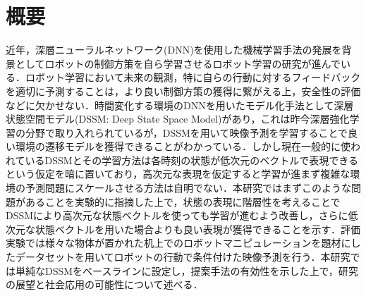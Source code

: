\chapter*{概要}
\label{chap:abstract}

近年，深層ニューラルネットワーク(DNN)を使用した機械学習手法の発展を背景としてロボットの制御方策を自ら学習させるロボット学習の研究が進んでいる．ロボット学習において未来の観測，特に自らの行動に対するフィードバックを適切に予測することは，より良い制御方策の獲得に繋がえる上，安全性の評価などに欠かせない．時間変化する環境のDNNを用いたモデル化手法として深層状態空間モデル(DSSM: Deep State Space Model)があり，これは昨今深層強化学習の分野で取り入れられているが，DSSMを用いて映像予測を学習することで良い環境の遷移モデルを獲得できることがわかっている．しかし現在一般的に使われているDSSMとその学習方法は各時刻の状態が低次元のベクトルで表現できるという仮定を暗に置いており，高次元な表現を仮定すると学習が進まず複雑な環境の予測問題にスケールさせる方法は自明でない．本研究ではまずこのような問題があることを実験的に指摘した上で，状態の表現に階層性を考えることでDSSMにより高次元な状態ベクトルを使っても学習が進むよう改善し，さらに低次元な状態ベクトルを用いた場合よりも良い表現が獲得できることを示す．評価実験では様々な物体が置かれた机上でのロボットマニピュレーションを題材にしたデータセットを用いてロボットの行動で条件付けた映像予測を行う．本研究では単純なDSSMをベースラインに設定し，提案手法の有効性を示した上で，研究の展望と社会応用の可能性について述べる．




